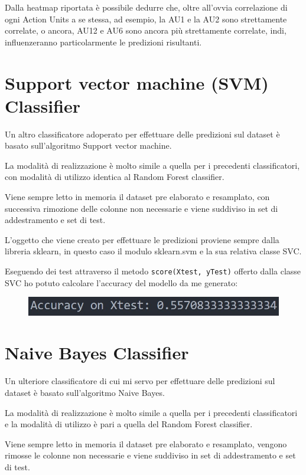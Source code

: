 Dalla heatmap riportata è possibile dedurre che, oltre all’ovvia correlazione di ogni Action Units a se stessa, ad esempio, la AU1 e la AU2 sono strettamente correlate, o ancora, AU12 e AU6 sono ancora più strettamente correlate, indi, influenzeranno particolarmente le predizioni risultanti.


\section{Support vector machine (SVM) Classifier}
Un altro classificatore adoperato per effettuare delle predizioni sul dataset è basato sull’algoritmo Support vector machine.

La modalità di realizzazione è molto simile a quella per i precedenti classificatori, con modalità di utilizzo identica al Random Forest classifier.

Viene sempre letto in memoria il dataset pre elaborato e resamplato, con successiva rimozione delle colonne non necessarie e viene suddiviso in set di addestramento e set di test.

L’oggetto che viene creato per effettuare le predizioni proviene sempre dalla libreria sklearn, in questo caso il modulo sklearn.svm e la sua relativa classe SVC.

Eseguendo dei test attraverso il metodo \mintinline[bgcolor=bg]
{python}{score(Xtest, yTest)} offerto dalla classe SVC ho potuto calcolare l’accuracy del modello da me generato:

\begin{figure}
    \begin{center}    
        \includegraphics[width=0.9\linewidth]{images/image40.jpeg}
    \end{center}
\end{figure}

\section{Naive Bayes Classifier}
Un ulteriore classificatore di cui mi servo per effettuare delle predizioni sul dataset è basato sull’algoritmo Naive Bayes.

La modalità di realizzazione è molto simile a quella per i precedenti classificatori e la modalità di utilizzo è pari a quella del Random Forest classifier.

Viene sempre letto in memoria il dataset pre elaborato e resamplato, vengono rimosse le colonne non necessarie e viene suddiviso in set di addestramento e set di test.


